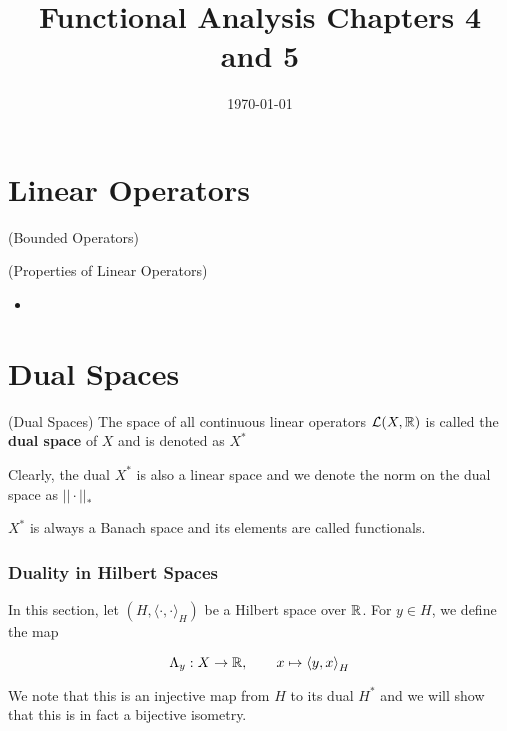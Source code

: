 \documentclass{article}
\title{Functional Analysis Chapters 4 and 5}
\date{\today}
\begin{document}
\maketitle

\section{Linear Operators}  

\begin{defn}
    (Bounded Operators)  
\end{defn}   

\begin{thm}
    (Properties of Linear Operators)  
    \begin{itemize}
        \item 
    \end{itemize}
\end{thm}  

\section{Dual Spaces}  

\begin{defn}
    (Dual Spaces) The space of all continuous linear operators $\mathcal{L}(X, \mathbb{R})$ is called the \textbf{dual space} of $X$ and is denoted as  $X^*$
\end{defn}  

Clearly, the dual $X^*$ is also a linear space and we denote the norm on the dual space as $||\cdot||_*$

\begin{remark}
    $X^*$ is always a Banach space and its elements are called functionals.
\end{remark}

\subsubsection{Duality in Hilbert Spaces}  
In this section, let $(H, {\langle \cdot, \cdot \rangle}_H )$ be a Hilbert space over $\mathbb{R}$. For $y\in H$, we define the map  

\begin{equation*}
    \Lambda_y: X \to \mathbb{R}, \qquad x \mapsto {\langle y, x \rangle}_H
\end{equation*}  

We note that this is an injective map from $H$ to its dual $H^*$ and we will show that this is in fact a bijective isometry.  
\end{document}
